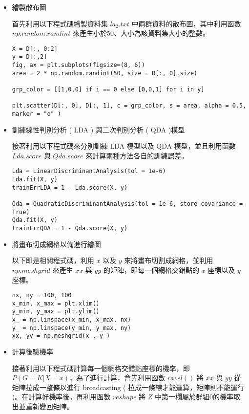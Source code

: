 \begin{itemize}
\item{} 繪製散布圖

首先利用以下程式碼繪製資料集 $la_2.txt$ 中兩群資料的散布圖，其中利用函數 $np.random.randint$ 來產生小於50、大小為該資料集大小的整數。

\bigskip
\begin{lstlisting}
X = D[:, 0:2]
y = D[:,2]
fig, ax = plt.subplots(figsize=(8, 6))
area = 2 * np.random.randint(50, size = D[:, 0].size) 

grp_color = [[1,0,0] if i == 0 else [0,0,1] for i in y]

plt.scatter(D[:, 0], D[:, 1], c = grp_color, s = area, alpha = 0.5, marker = "o" )

\end{lstlisting}

\item{} 訓練線性判別分析 ( LDA ) 與二次判別分析 ( QDA )模型

接著利用以下程式碼來分別訓練 LDA 模型以及 QDA 模型，並且利用函數 $Lda.score$ 與 $Qda.score$ 來計算兩種方法各自的訓練誤差。

\bigskip
\begin{lstlisting}
Lda = LinearDiscriminantAnalysis(tol = 1e-6)
Lda.fit(X, y)
trainErrLDA = 1 - Lda.score(X, y)

Qda = QuadraticDiscriminantAnalysis(tol = 1e-6, store_covariance = True)
Qda.fit(X, y)
trainErrQDA = 1 - Qda.score(X, y)
\end{lstlisting}


\item{} 將畫布切成網格以備進行繪圖

以下即是相關程式碼，利用 $x$ 以及 $y$ 來將畫布切割成網格，並利用 $np.meshgrid$ 來產生 $xx$ 與 $yy$ 的矩陣，即每一個網格交錯點的 $x$ 座標以及 $y$ 座標。

\bigskip
\begin{lstlisting}
nx, ny = 100, 100 
x_min, x_max = plt.xlim()
y_min, y_max = plt.ylim()
x_ = np.linspace(x_min, x_max, nx)
y_ = np.linspace(y_min, y_max, ny)
xx, yy = np.meshgrid(x_, y_) 
\end{lstlisting}

\item{} 計算後驗機率

接著利用以下程式碼計算每一個網格交錯點座標的機率，即 $P(G=K|X=x)$，為了進行計算，會先利用函數 $ravel()$ 將 $xx$ 與 $yy$ 從矩陣拉成一整條以進行 broadcasting ( 拉成一條線才能運算，矩陣則不能運行 )。在計算好機率後，再利用函數 $reshape$ 將 $Z$ 中第一欄屬於群組0的機率取出並重新變回矩陣。


\end{itemize}
